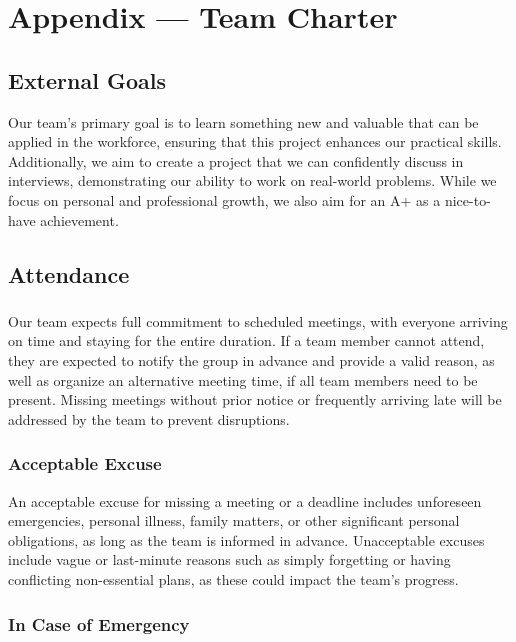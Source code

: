 \documentclass{article}
\begin{document}
\newpage{}

\section*{Appendix --- Team Charter}

\subsection*{External Goals}

Our team's primary goal is to learn something new and valuable that can be applied in the workforce,
ensuring that this project enhances our practical skills. Additionally, we aim to create a project
that we can confidently discuss in interviews, demonstrating our ability to work on real-world
problems. While we focus on personal and professional growth, we also aim for an A+ as a
nice-to-have achievement.

\subsection*{Attendance}

\subsubsection*{\color{blue}{Expectations}}

Our team expects full commitment to scheduled meetings, with everyone arriving on time and staying
for the entire duration. If a team member cannot attend, they are expected to notify the group in
advance and provide a valid reason, as well as organize an alternative meeting time, if all team
members need to be present. Missing meetings without prior notice or frequently arriving late
will be addressed by the team to prevent disruptions.

\subsubsection*{\color{blue}Acceptable Excuse}

An acceptable excuse for missing a meeting or a deadline includes unforeseen emergencies, personal
illness, family matters, or other significant personal obligations, as long as the team is
informed in advance. Unacceptable excuses include vague or last-minute reasons such as simply
forgetting or having conflicting non-essential plans, as these could impact the team's progress.

\subsubsection*{\color{blue}In Case of Emergency}
\end{document}
